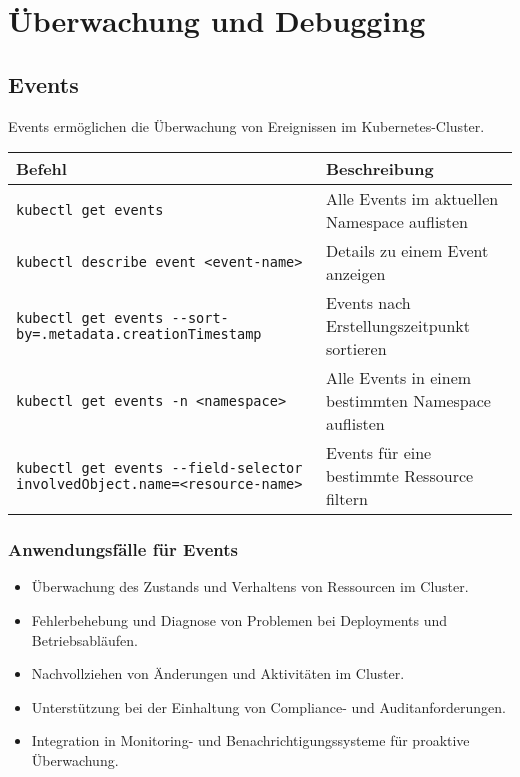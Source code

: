 \chapter{Überwachung und Debugging}

\section{Events}
Events ermöglichen die Überwachung von Ereignissen im Kubernetes-Cluster.\\

\noindent
\begin{tabular}{|p{}|p{}|}
\hline
\textbf{Befehl} & \textbf{Beschreibung} \\
\hline
\texttt{kubectl get events} & Alle Events im aktuellen Namespace auflisten \\
\texttt{kubectl describe event <event-name>} & Details zu einem Event anzeigen \\
\texttt{kubectl get events {-}{-}sort-by=.metadata.creationTimestamp} & Events nach Erstellungszeitpunkt sortieren \\
\texttt{kubectl get events -n <namespace>} & Alle Events in einem bestimmten Namespace auflisten \\
\texttt{kubectl get events {-}{-}field-selector involvedObject.name=<resource-name>} & Events für eine bestimmte Ressource filtern \\
\hline
\end{tabular}

\subsection{Anwendungsfälle für Events}
\begin{itemize}
    \item Überwachung des Zustands und Verhaltens von Ressourcen im Cluster.
    \item Fehlerbehebung und Diagnose von Problemen bei Deployments und Betriebsabläufen.
    \item Nachvollziehen von Änderungen und Aktivitäten im Cluster.
    \item Unterstützung bei der Einhaltung von Compliance- und Auditanforderungen.
    \item Integration in Monitoring- und Benachrichtigungssysteme für proaktive Überwachung.
\end{itemize}

